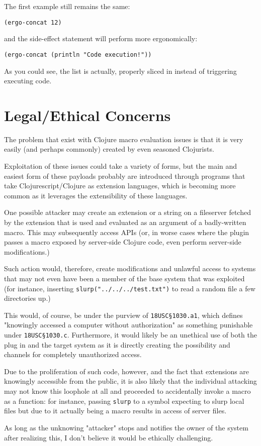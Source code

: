 \documentclass[letterpaper]{article}
\begin{document}
The first example still remains the same:

\begin{verbatim}
(ergo-concat 12)
\end{verbatim}

and the side-effect statement will perform more ergonomically: 

\begin{verbatim}
(ergo-concat (println "Code execution!"))
\end{verbatim}

As you could see, the list is actually, properly sliced in instead of triggering executing code.

\section{Legal/Ethical Concerns}
\label{sec:orgb2b4c06}
The problem that exist with Clojure macro evaluation issues is that it is very easily (and perhaps commonly) created by even seasoned Clojurists.

Exploitation of these issues could take a variety of forms, but the main and easiest form of these payloads probably are introduced through programs that take Clojurescript/Clojure as extension languages, which is becoming more common as it leverages the extensibility of these languages.

One possible attacker may create an extension or a string on a fileserver fetched by the extension that is used and evaluated as an argument of a badly-written macro. This may subsequently access APIs (or, in worse cases where the plugin passes a macro exposed by server-side Clojure code, even perform server-side modifications.)

Such action would, therefore, create modifications and unlawful access to systems that may not even have been a member of the base system that was exploited (for instance, inserting \texttt{slurp("../../../test.txt")} to read a random file a few directories up.)

This would, of course, be under the purview of \texttt{18USC§1030.a1}, which defines "knowingly accessed a computer without authorization" as something punishable under \texttt{18USC§1030.c}. Furthermore, it would likely be an unethical use of both the plug in and the target system as it is directly creating the possibility and channels for completely unauthorized access.

Due to the proliferation of such code, however, and the fact that extensions are knowingly accessible from the public, it is also likely that the individual attacking may not know this loophole at all and proceeded to accidentally invoke a macro as a function: for instance, passing \texttt{slurp} to a symbol expecting to slurp local files but due to it actually being a macro results in access of server files.

As long as the unknowing "attacker" stops and notifies the owner of the system after realizing this, I don't believe it would be ethically challenging.
\end{document}
